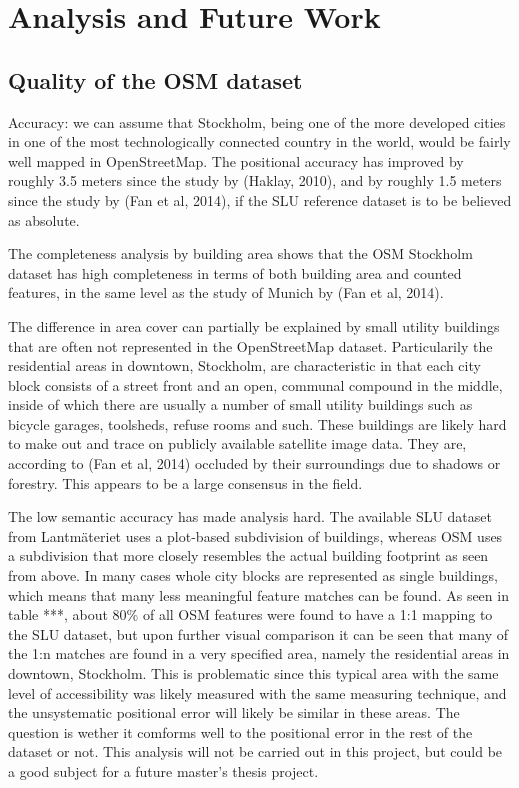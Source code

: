\documentclass[a4paper]{article}
\begin{document}
\section{Analysis and Future Work}

\subsection{Quality of the OSM dataset}

Accuracy: we can assume that Stockholm, being one of the more developed cities in one of the most technologically connected country in the world, would be fairly well mapped in OpenStreetMap. The positional accuracy has improved by roughly 3.5 meters since the study by (Haklay, 2010), and by roughly 1.5 meters since the study by (Fan et al, 2014), if the SLU reference dataset is to be believed as absolute.

The completeness analysis by building area shows that the OSM Stockholm dataset has high completeness in terms of both building area and counted features, in the same level as the study of Munich by (Fan et al, 2014).

The difference in area cover can partially be explained by small utility buildings that are often not represented in the OpenStreetMap dataset. Particularily the residential areas in downtown, Stockholm, are characteristic in that each city block consists of a street front and an open, communal compound in the middle, inside of which there are usually a number of small utility buildings such as bicycle garages, toolsheds, refuse rooms and such. These buildings are likely hard to make out and trace on publicly available satellite image data. They are, according to (Fan et al, 2014) occluded by their surroundings due to shadows or forestry. This appears to be a large consensus in the field.

The low semantic accuracy has made analysis hard. The available SLU dataset from Lantmäteriet uses a plot-based subdivision of buildings, whereas OSM uses a subdivision that more closely resembles the actual building footprint as seen from above. In many cases whole city blocks are represented as single buildings, which means that many less meaningful feature matches can be found.
As seen in table ***, about 80\% of all OSM features were found to have a 1:1 mapping to the SLU dataset, but upon further visual comparison it can be seen that many of the 1:n matches are found in a very specified area, namely the residential areas in downtown, Stockholm. This is problematic since this typical area with the same level of accessibility was likely measured with the same measuring technique, and the unsystematic positional error will likely be similar in these areas. The question is wether it comforms well to the positional error in the rest of the dataset or not. This analysis will not be carried out in this project, but could be a good subject for a future master's thesis project.
\end{document}
